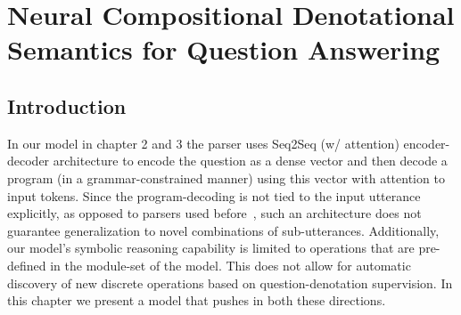\documentclass[main.tex]{subfiles}
\begin{document}
\section{Neural Compositional Denotational Semantics for Question Answering} %
\label{sec:denotation-semantics}

\subsection{Introduction}
In our model in chapter 2 and 3 the parser uses Seq2Seq (w/ attention) encoder-decoder architecture to encode the question as a dense vector and then decode a program (in a grammar-constrained manner) using this vector with attention to input tokens.  Since the program-decoding is not tied to the input utterance explicitly, as opposed to parsers used before~\cite{zettlemoyer-pccg-2005,instructaction-artzi-2013,pasupat-liang-2015}, such an architecture does not guarantee generalization to novel combinations of sub-utterances.
Additionally, our model's symbolic reasoning capability is limited to operations that are pre-defined in the module-set of the model.  This does not allow for automatic discovery of new discrete operations based on question-denotation supervision.  In this chapter we present a model that pushes in both these directions.
\end{document}
